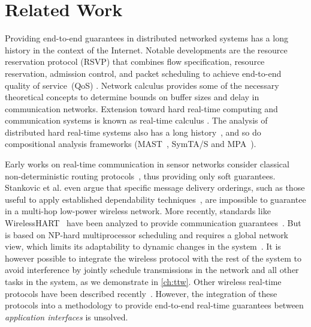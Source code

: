 
\section{Related Work}
\label{sec:relWork}

Providing end-to-end guarantees in distributed networked systems has a long history in the context of the Internet. Notable developments are the resource reservation protocol (RSVP) that combines flow specification, resource reservation, admission control, and packet scheduling to achieve end-to-end quality of service~(QoS) \cite{zhang1993rsvp}. Network calculus \cite{cruz1991calculus} provides some of the necessary theoretical concepts to determine bounds on buffer sizes and delay in communication networks.
Extension toward hard real-time computing and communication systems is known as real-time calculus \cite{thiele2000Realtime}.
The analysis of distributed hard real-time systems also has a long history~\cite{tindell1994Holistic}, and so do compositional analysis frameworks (MAST~\cite{gonzalezharbour2001MAST}, SymTA/S \cite{henia2005System} and MPA~\cite{wandeler2006System}).

Early works on real-time communication in sensor networks consider classical non-deterministic routing protocols~\cite{lu2002RAP,stankovic2003Realtime,he2003SPEED}, thus providing only soft guarantees.
Stankovic et al. \cite{stankovic2003Realtime} even argue that specific message delivery orderings, such as those useful to apply established dependability techniques~\cite{ferrari2013Virtus}, are impossible to guarantee in a multi-hop low-power wireless network.
More recently, standards like WirelessHART~\cite{wirelessHART} have been analyzed to provide communication guarantees~\cite{saifullah2015EndtoEnd,saifullah2010RealTime}.
But~\cite{saifullah2010RealTime} is based on NP-hard multiprocessor scheduling and requires a global network view, which limits its adaptability to dynamic changes in the system~\cite{akerberg2011Measurements}.
It is however possible to integrate the wireless protocol with the rest of the system to avoid interference by jointly schedule transmissions in the network and all other tasks in the system, as we demonstrate in \cref{ch:ttw}.
Other wireless real-time protocols have been described recently~\cite{odonovan2013GINSENG,watteyne2017Teaching}. However, the integration of these protocols into a methodology to provide end-to-end real-time guarantees between \emph{application interfaces} is unsolved.

